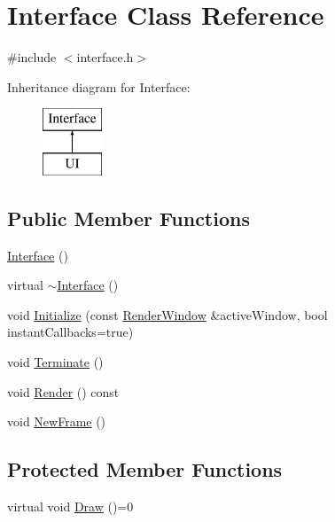 \hypertarget{class_interface}{}\section{Interface Class Reference}
\label{class_interface}


{\ttfamily \#include $<$interface.\+h$>$}

Inheritance diagram for Interface\+:\begin{figure}[H]
\begin{center}
\leavevmode
\includegraphics[height=2.000000cm]{class_interface}
\end{center}
\end{figure}
\subsection*{Public Member Functions}
\begin{DoxyCompactItemize}
\item 
\hyperlink{class_interface_a4406d74c75bdfe150bf72be1f1cda8b1}{Interface} ()
\item 
virtual \hyperlink{class_interface_a19179888f29f18f1be54a3dfe98f68c0}{$\sim$\+Interface} ()
\item 
void \hyperlink{class_interface_aeac0b572a2d73782b27da1f0084f0f5f}{Initialize} (const \hyperlink{class_render_window}{Render\+Window} \&active\+Window, bool instant\+Callbacks=true)
\item 
void \hyperlink{class_interface_a2bdcd6b2c85bb5f0bd756524a821b9df}{Terminate} ()
\item 
void \hyperlink{class_interface_a637ef08a4ccaaeedd10572470cf0afce}{Render} () const 
\item 
void \hyperlink{class_interface_ad7f4818ee9560b0462fc46ff82188413}{New\+Frame} ()
\end{DoxyCompactItemize}
\subsection*{Protected Member Functions}
\begin{DoxyCompactItemize}
\item 
virtual void \hyperlink{class_interface_a82df247fd022d924995421ab90444945}{Draw} ()=0
\end{DoxyCompactItemize}


